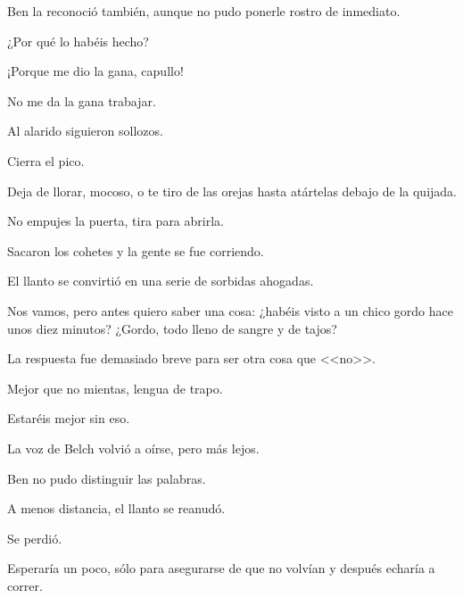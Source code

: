 \sk
Ben la reconoció también, aunque no pudo ponerle rostro de
inmediato.

\sk
¿Por qué lo habéis hecho?

\sk
¡Porque me dio la gana, capullo!

\sk
No me da la gana trabajar.

\sk
Al alarido siguieron sollozos.

\sk
Cierra el pico. 

\sk
Deja de llorar, mocoso, o te tiro de las orejas hasta atártelas
debajo de la quijada.

\sk
No empujes la puerta, tira para abrirla.

\sk
Sacaron los cohetes y la gente se fue corriendo.

\sk
El llanto se convirtió en una serie de sorbidas ahogadas.

\sk
Nos vamos, pero antes
quiero saber una cosa: ¿habéis visto a un chico
gordo hace unos diez minutos? ¿Gordo, todo lleno
de sangre y de tajos?

\sk
La respuesta fue demasiado breve para ser otra cosa que <<no>>.

\sk
Mejor que no mientas, lengua de trapo.

\sk
Estaréis mejor sin eso.

\sk
La voz de Belch volvió a oírse, pero más lejos.

\sk
Ben no pudo distinguir las palabras.

\sk
A menos distancia, el llanto se reanudó.

\sk
Se perdió. 

\sk
Esperaría un poco, sólo para asegurarse de que no volvían y
después echaría a correr.

